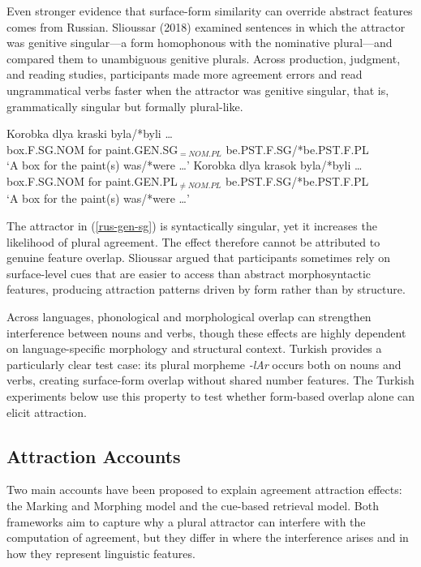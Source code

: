 \documentclass[
  authoryear,
  preprint]{elsarticle}
\begin{document}
Even stronger evidence that surface-form similarity can override
abstract features comes from Russian. Slioussar (2018) examined
sentences in which the attractor was genitive singular---a form
homophonous with the nominative plural---and compared them to
unambiguous genitive plurals. Across production, judgment, and reading
studies, participants made more agreement errors and read ungrammatical
verbs faster when the attractor was genitive singular, that is,
grammatically singular but formally plural-like.

\begin{exe}
\ex \label{rus}
\begin{xlist}
\ex \label{rus-gen-sg}
\gll Korobka dlya kraski byla/*byli \ldots \\
box.F.SG.NOM for paint.GEN.SG$_{=NOM.PL}$ be.PST.F.SG/*be.PST.F.PL \\
\glt `A box for the paint(s) was/*were \dots'
\ex \label{rus-gen-pl}
\gll Korobka dlya krasok byla/*byli \ldots \\
box.F.SG.NOM for paint.GEN.PL$_{\neq NOM.PL}$ be.PST.F.SG/*be.PST.F.PL \\
\glt `A box for the paint(s) was/*were \dots'
\end{xlist}
\end{exe}

The attractor in (\ref{rus-gen-sg}) is syntactically singular, yet it
increases the likelihood of plural agreement. The effect therefore
cannot be attributed to genuine feature overlap. Slioussar argued that
participants sometimes rely on surface-level cues that are easier to
access than abstract morphosyntactic features, producing attraction
patterns driven by form rather than by structure.

Across languages, phonological and morphological overlap can strengthen
interference between nouns and verbs, though these effects are highly
dependent on language-specific morphology and structural context.
Turkish provides a particularly clear test case: its plural morpheme
\emph{-lAr} occurs both on nouns and verbs, creating surface-form
overlap without shared number features. The Turkish experiments below
use this property to test whether form-based overlap alone can elicit
attraction.

\subsection{Attraction Accounts}\label{attraction-accounts}

Two main accounts have been proposed to explain agreement attraction
effects: the Marking and Morphing model and the cue-based retrieval
model. Both frameworks aim to capture why a plural attractor can
interfere with the computation of agreement, but they differ in where
the interference arises and in how they represent linguistic features.
\end{document}
